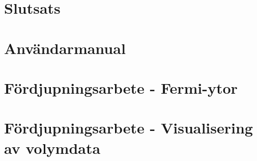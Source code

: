 \documentclass[a4paper,12pt]{article}
\begin{document}
\section{Slutsats}


\newpage
{}
\printbibliography{}

\begin{appendices}

\section{Användarmanual}
\label{appendix:användarmanual}





\section{Fördjupningsarbete - Fermi-ytor}
\label{appendix:fermi-ytor}

\section{Fördjupningsarbete - Visualisering av volymdata}
\label{appendix:visualisering}










\end{appendices}
\end{document}
